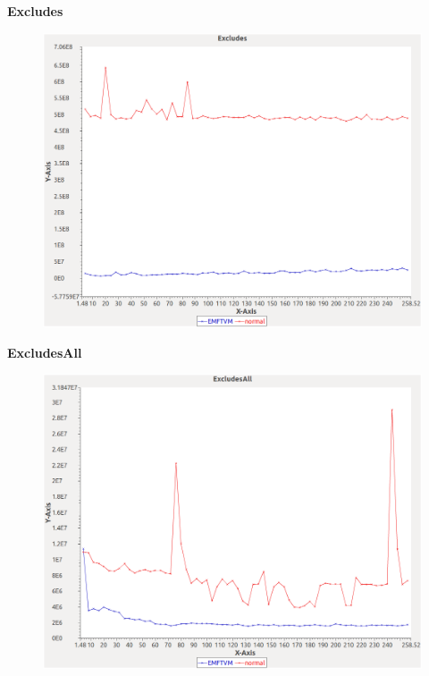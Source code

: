 \noindent\textbf{Excludes}

\begin{figure}[h]
\centering
\includegraphics[width=\textwidth]{graphs/orderedset/Excludes}
\end{figure}
\pagebreak

\noindent\textbf{ExcludesAll}

\begin{figure}[h]
\centering
\includegraphics[width=\textwidth]{graphs/orderedset/ExcludesAll}
\end{figure}
\pagebreak

